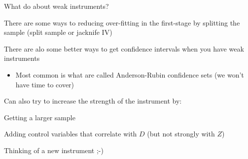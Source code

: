 \documentclass[11pt,english,handout]{beamer}
\newenvironment{wideitemize}{\itemize\addtolength{\itemsep}{10pt}}{\enditemize}
\begin{document}
\begin{frame}{What do about weak instruments?}
	\begin{wideitemize}
		\item
		There are some ways to reducing over-fitting in the first-stage by splitting the sample (split sample or jacknife IV)
		
		\item
		There are alo some better ways to get confidence intervals when you have weak instruments
			\begin{itemize}
				\item 
				Most common is what are called Anderson-Rubin confidence sets (we won't have time to cover)
			\end{itemize}
		
		\item
		Can also try to increase the strength of the instrument by:
		
			\begin{wideitemize}
				\item
				Getting a larger sample
				
				\item
				Adding control variables that correlate with $D$ (but not strongly with $Z$)
				
				\item
				Thinking of a new instrument ;-)
			\end{wideitemize}
	\end{wideitemize}
\end{frame}









\end{document}
